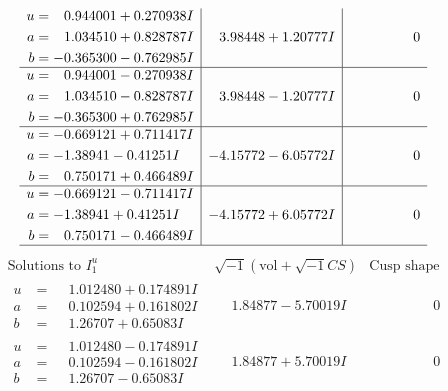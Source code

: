 \documentclass[1p]{elsarticle_modified}
\theoremstyle{definition}
\newcommand{\I}{\sqrt{-1}}
\begin{document}
$$\begin{array}{c|c|c}
\begin{aligned}
u &= \phantom{-}0.944001 + 0.270938 I \\
a &= \phantom{-}1.034510 + 0.828787 I \\
b &= -0.365300 - 0.762985 I\end{aligned}
 & \phantom{-}3.98448 + 1.20777 I & \phantom{-0.000000 } 0 \\ \hline\begin{aligned}
u &= \phantom{-}0.944001 - 0.270938 I \\
a &= \phantom{-}1.034510 - 0.828787 I \\
b &= -0.365300 + 0.762985 I\end{aligned}
 & \phantom{-}3.98448 - 1.20777 I & \phantom{-0.000000 } 0 \\ \hline\begin{aligned}
u &= -0.669121 + 0.711417 I \\
a &= -1.38941 - 0.41251 I \\
b &= \phantom{-}0.750171 + 0.466489 I\end{aligned}
 & -4.15772 - 6.05772 I & \phantom{-0.000000 } 0 \\ \hline\begin{aligned}
u &= -0.669121 - 0.711417 I \\
a &= -1.38941 + 0.41251 I \\
b &= \phantom{-}0.750171 - 0.466489 I\end{aligned}
 & -4.15772 + 6.05772 I & \phantom{-0.000000 } 0\\
 \hline 
 \end{array}$$\newpage$$\begin{array}{c|c|c}  
\text{Solutions to }I^u_{1}& \I (\text{vol} + \sqrt{-1}CS) & \text{Cusp shape}\\
 \hline 
\begin{aligned}
u &= \phantom{-}1.012480 + 0.174891 I \\
a &= \phantom{-}0.102594 + 0.161802 I \\
b &= \phantom{-}1.26707 + 0.65083 I\end{aligned}
 & \phantom{-}1.84877 - 5.70019 I & \phantom{-0.000000 } 0 \\ \hline\begin{aligned}
u &= \phantom{-}1.012480 - 0.174891 I \\
a &= \phantom{-}0.102594 - 0.161802 I \\
b &= \phantom{-}1.26707 - 0.65083 I\end{aligned}
 & \phantom{-}1.84877 + 5.70019 I & \phantom{-0.000000 } 0 \\ \hline\begin{aligned}

\end{aligned}
\end{array}$$
\end{document}

